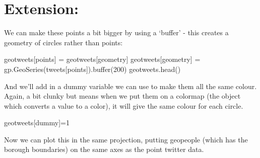 \documentclass[
  letterpaper,
  DIV=11,
  numbers=noendperiod]{scrreprt}
\newenvironment{Shaded}{\begin{snugshade}}{\end{snugshade}}
\newcommand{\BuiltInTok}[1]{\textcolor[rgb]{0.00,0.23,0.31}{#1}}
\newcommand{\DecValTok}[1]{\textcolor[rgb]{0.68,0.00,0.00}{#1}}
\newcommand{\NormalTok}[1]{\textcolor[rgb]{0.00,0.23,0.31}{#1}}
\newcommand{\OperatorTok}[1]{\textcolor[rgb]{0.37,0.37,0.37}{#1}}
\newcommand{\StringTok}[1]{\textcolor[rgb]{0.13,0.47,0.30}{#1}}
\begin{document}
\hypertarget{extension-1}{%
\section{Extension:}\label{extension-1}}

We can make these points a bit bigger by using a `buffer' - this creates
a geometry of circles rather than points:

\begin{Shaded}
\begin{Highlighting}[]
\NormalTok{geotweets[}\StringTok{\textquotesingle{}points\textquotesingle{}}\NormalTok{] }\OperatorTok{=}\NormalTok{ geotweets[}\StringTok{\textquotesingle{}geometry\textquotesingle{}}\NormalTok{]}
\NormalTok{geotweets[}\StringTok{\textquotesingle{}geometry\textquotesingle{}}\NormalTok{] }\OperatorTok{=}\NormalTok{ gp.GeoSeries(tweets[}\StringTok{\textquotesingle{}points\textquotesingle{}}\NormalTok{]).}\BuiltInTok{buffer}\NormalTok{(}\DecValTok{200}\NormalTok{)}
\NormalTok{geotweets.head()}
\end{Highlighting}
\end{Shaded}

And we'll add in a dummy variable we can use to make them all the same
colour. Again, a bit clunky but means when we put them on a colormap
(the object which converts a value to a color), it will give the same
colour for each circle.

\begin{Shaded}
\begin{Highlighting}[]
\NormalTok{geotweets[}\StringTok{\textquotesingle{}dummy\textquotesingle{}}\NormalTok{]}\OperatorTok{=}\DecValTok{1}
\end{Highlighting}
\end{Shaded}

Now we can plot this in the same projection, putting geopeople (which
has the borough boundaries) on the same axes as the point twitter data.
\end{document}
